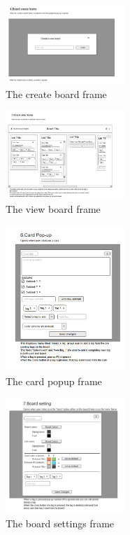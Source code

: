 \begin{figure}[h]
    \includegraphics[width=0.4\textwidth]{content/images/4.BoardCreate.png}
    \caption{The create board frame}
    \label{fig:board-create}
\end{figure}

\begin{figure}[h]
    \includegraphics[width=0.4\textwidth]{content/images/5.BoardView.png}
    \caption{The view board frame}
    \label{fig:board-view}
\end{figure}

\begin{figure}[h]
    \includegraphics[width=0.4\textwidth]{content/images/6.CardPopup.png}
    \caption{The card popup frame}
    \label{fig:card-popup}
\end{figure}

\begin{figure}[h]
    \includegraphics[width=0.4\textwidth]{content/images/7.BoardSetting.png}
    \caption{The board settings frame}
    \label{fig:board-settings}
\end{figure}

